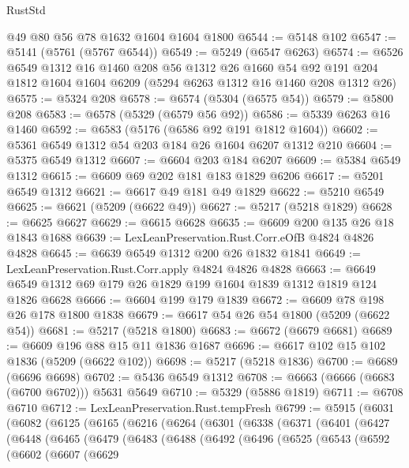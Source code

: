 \begin{lexlean}{RustStd}
\begin{coremodule}
    @49
    @80
    @56
    @78
    @1632
    @1604
    @1604
    @1800
@6544 := @5148 @102
@6547 := @5141 (@5761 (@5767 @6544))
@6549 := @5249 (@6547 @6263)
@6574 := @6526
    @6549
    @1312
    @16
    @1460
    @208
    @56
    @1312
    @26
    @1660
    @54
    @92
    @191
    @204
    @1812
    @1604
    @1604
    @6209
    (@5294 @6263 @1312 @16 @1460 @208 @1312 @26)
@6575 := @5324 @208
@6578 := @6574 (@5304 (@6575 @54))
@6579 := @5800 @208
@6583 := @6578 (@5329 (@6579 @56 @92))
@6586 := @5339 @6263 @16 @1460
@6592 := @6583 (@5176 (@6586 @92 @191 @1812 @1604))
@6602 := @5361 @6549 @1312 @54 @203 @184 @26 @1604 @6207 @1312 @210
@6604 := @5375 @6549 @1312
@6607 := @6604 @203 @184 @6207
@6609 := @5384 @6549 @1312
@6615 := @6609 @69 @202 @181 @183 @1829 @6206
@6617 := @5201 @6549 @1312
@6621 := @6617 @49 @181 @49 @1829
@6622 := @5210 @6549
@6625 := @6621 (@5209 (@6622 @49))
@6627 := @5217 (@5218 @1829)
@6628 := @6625 @6627
@6629 := @6615 @6628
@6635 := @6609 @200 @135 @26 @18 @1843 @1688
@6639 := LexLeanPreservation.Rust.Corr.eOfB @4824 @4826 @4828
@6645 := @6639 @6549 @1312 @200 @26 @1832 @1841
@6649 := LexLeanPreservation.Rust.Corr.apply @4824 @4826 @4828
@6663 := @6649 @6549 @1312 @69 @179 @26 @1829 @199 @1604 @1839 @1312 @1819 @124 @1826 @6628
@6666 := @6604 @199 @179 @1839
@6672 := @6609 @78 @198 @26 @178 @1800 @1838
@6679 := @6617 @54 @26 @54 @1800 (@5209 (@6622 @54))
@6681 := @5217 (@5218 @1800)
@6683 := @6672 (@6679 @6681)
@6689 := @6609 @196 @88 @15 @11 @1836 @1687
@6696 := @6617 @102 @15 @102 @1836 (@5209 (@6622 @102))
@6698 := @5217 (@5218 @1836)
@6700 := @6689 (@6696 @6698)
@6702 := @5436 @6549 @1312
@6708 := @6663 (@6666 (@6683 (@6700 @6702))) @5631 @5649
@6710 := @5329 (@5886 @1819)
@6711 := @6708 @6710
@6712 := LexLeanPreservation.Rust.tempFresh
@6799 := @5915
    (@6031
      (@6082
        (@6125
          (@6165
            (@6216
              (@6264
                (@6301
                  (@6338
                    (@6371
                      (@6401
                        (@6427
                          (@6448
                            (@6465
                              (@6479
                                (@6483
                                  (@6488
                                    (@6492
                                      (@6496
                                        (@6525
                                          (@6543
                                            (@6592
                                              (@6602
                                                (@6607
                                                  (@6629

\end{coremodule}
\end{lexlean}
